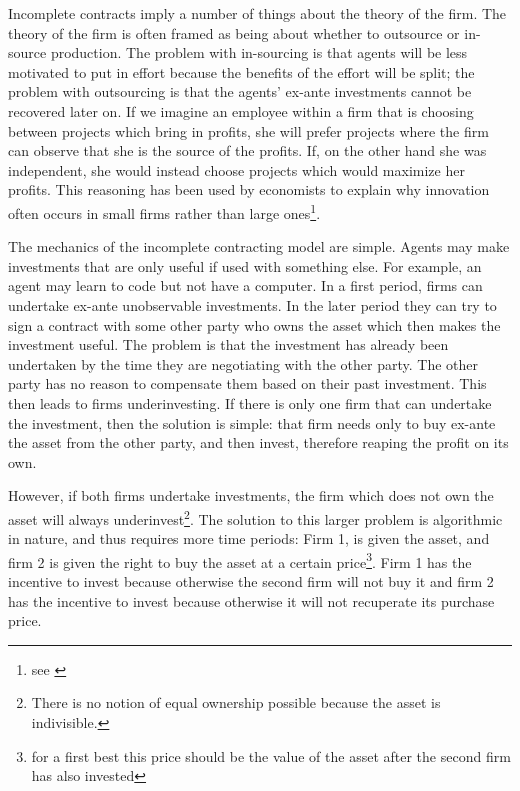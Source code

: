Incomplete contracts imply a number of things about the theory of the firm. The theory of the firm is often framed as being about whether to outsource or in-source production. The problem with in-sourcing is that agents will be less motivated to put in effort because the benefits of the effort will be split; the problem with outsourcing is that the agents' ex-ante investments cannot be recovered later on. If we imagine an employee within a firm that is choosing between projects which bring in profits, she will prefer projects where the firm can observe that she is the source of the profits. If, on the other hand she was independent, she would instead choose projects which would maximize her profits. This reasoning has been used by economists to explain why innovation often occurs in small firms rather than large ones\footnote{see \cite{Holmstrom1989} }.

The mechanics of the incomplete contracting model are simple. Agents may make investments that are only useful if used with something else. For example, an agent may learn to code but not have a computer. In a first period, firms can undertake ex-ante unobservable investments. In the later period they can try to sign a contract with some other party who owns the asset which then makes the investment useful. The problem is that the investment has already been undertaken by the time they are negotiating with the other party. The other party has no reason to compensate them based on their past investment. This then leads to firms underinvesting. If there is only one firm that can undertake the investment, then the solution is simple: that firm needs only to buy ex-ante the asset from the other party, and then invest, therefore reaping the profit on its own.

However, if both firms undertake investments, the firm which does not own the asset will always underinvest\footnote{There is no notion of equal ownership possible because the asset is indivisible.}.  The solution to this larger problem is algorithmic in nature, and thus requires more time periods: Firm 1, is given the asset, and firm 2 is given the right to buy the asset at a certain price\footnote{for a first best this price should be the value of the asset after the second firm has also invested}. Firm 1 has the incentive to invest because otherwise the second firm will not buy it and firm 2 has the incentive to invest because otherwise it will not recuperate its purchase price.

